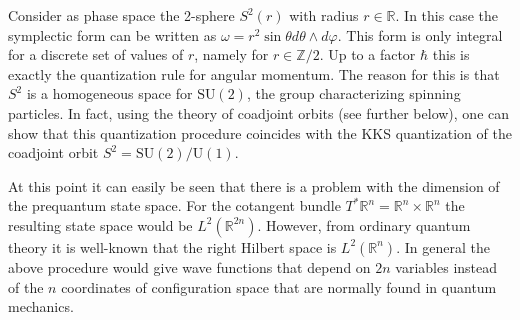 
    \begin{example}
        Consider as phase space the 2-sphere $S^2(r)$ with radius $r\in\mathbb{R}$. In this case the symplectic form can be written as $\omega=r^2\sin\theta d\theta\wedge d\varphi$. This form is only integral for a discrete set of values of $r$, namely for $r\in\mathbb{Z}/2$. Up to a factor $\hbar$ this is exactly the quantization rule for angular momentum. The reason for this is that $S^2$ is a homogeneous space for $\text{SU}(2)$, the group characterizing spinning particles. In fact, using the theory of coadjoint orbits (see further below), one can show that this quantization procedure coincides with the KKS quantization of the coadjoint orbit $S^2=\text{SU}(2)/\text{U}(1)$.
    \end{example}

    At this point it can easily be seen that there is a problem with the dimension of the prequantum state space. For the cotangent bundle $T^*\mathbb{R}^n = \mathbb{R}^n\times\mathbb{R}^n$ the resulting state space would be $L^2(\mathbb{R}^{2n})$. However, from ordinary quantum theory it is well-known that the right Hilbert space is $L^2(\mathbb{R}^n)$. In general the above procedure would give wave functions that depend on $2n$ variables instead of the $n$ coordinates of configuration space that are normally found in quantum mechanics.

